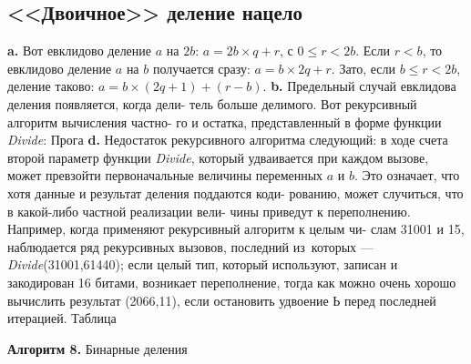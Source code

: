 \documentclass{mai_book}
\begin{document}
\subsection{<<Двоичное>> деление нацело}
\hspace*{15pt}\textbf{a.} Вот евклидово деление $a$ на $2b$: $a=2b\times q+r$, с $0\leq r<2b$. Если
$r<b$, то евклидово деление $a$ на $b$ получается сразу: $a=b\times 2q+r$. Зато,
если $b\leq r<2b$, деление таково: $a=b\times(2q+1)+(r-b)$.\newpage
\textbf{b.} Предельный случай евклидова деления появляется, когда дели-\newline
тель больше делимого. Вот рекурсивный алгоритм вычисления частно-
го и остатка, представленный в форме функции \textit{Divide}:\newline
Прога\newline
\hspace*{15pt}\textbf{d.} Недостаток рекурсивного алгоритма следующий: в ходе счета
второй параметр функции \textit{Divide}, который удваивается при каждом
вызове, может превзойти первоначальные величины переменных $a$ и $b$.
Это означает, что хотя данные и результат деления поддаются коди-
рованию, может случиться, что в какой-либо частной реализации вели-
чины приведут к переполнению.\newline
\hspace*{15pt}Например, когда применяют рекурсивный алгоритм к целым чи-
слам 31001 и 15, наблюдается ряд рекурсивных вызовов, последний из\
которых — \textit{Divide}(31001,61440); если целый тип, который используют,
записан и закодирован 16 битами, возникает переполнение, тогда как
можно очень хорошо вычислить результат (2066,11), если остановить
удвоение Ь перед последней итерацией.\newline
Таблица\newline
\begin{center}
\textbf{Алгоритм 8.} Бинарные деления
\end{center}
\newpage
\end{document}
